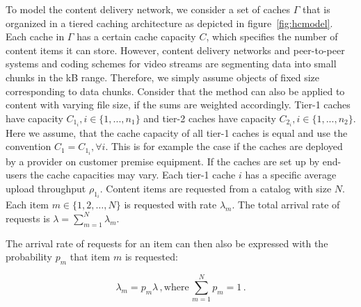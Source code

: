 To model the content delivery network, we consider a set of caches $\Gamma$ that is organized in a tiered caching architecture as depicted in figure~\ref{fig:hcmodel}. Each cache in $\Gamma$ has a certain cache capacity $C$, which specifies the number of content items it can store.
However, content delivery networks and peer-to-peer systems and coding schemes for video streams are segmenting data into small chunks in the kB range.
Therefore, we simply assume objects of fixed size corresponding to data chunks.
Consider that the method can also be applied to content with varying file size, if the sums are weighted accordingly.
Tier-1 caches have capacity $C_{1_i}, i\in\{1,...,n_1\}$ and tier-2 caches have capacity $C_{2_i}, i\in\{1,...,n_2\}$.
Here we assume, that the cache capacity of all tier-1 caches is equal and use the convention $C_1=C_{1_i}, \forall i$.
This is for example the case if the caches are deployed by a provider on customer premise equipment.
If the caches are set up by end-users the cache capacities may vary.
Each tier-1 cache $i$ has a specific average upload throughput $\rho_{1_i}$.
Content items are requested from a catalog with size $N$.
Each item $m\in \{1,2,\dots,N\}$ is requested with rate $\lambda_m$.
The total arrival rate of requests is $\lambda=\sum_{m=1}^N \lambda_m$.

The arrival rate of requests for an item can then also be expressed with the probability $p_m$ that item $m$ is requested:

\begin{equation}
\lambda_m = p_m \lambda \, , \text{where} \, \sum_{m=1}^N p_m = 1 \, .
\end{equation}



